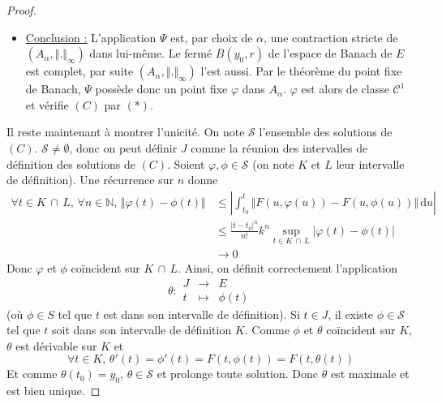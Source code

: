 \begin{proof}
\begin{itemize}
      où $k$ désigne le rapport de lipschitziannité de $F$. On choisit désormais $\alpha$ tel que $k \alpha < 1$ et $\alpha M < r$.
      \item \uline{Conclusion :} L'application $\Psi$ est, par choix de $\alpha$, une contraction stricte de $(A_\alpha, \Vert . \Vert_{\infty})$ dans lui-même. Le fermé $\overline{B}(y_0, r)$ de l'espace de Banach de $E$ est complet, par suite $(A_\alpha, \Vert . \Vert_{\infty})$ l'est aussi.
      \newpar
      Par le théorème du point fixe de Banach, $\Psi$ possède donc un point fixe $\varphi$ dans $A_\alpha$. $\varphi$ est alors de classe $\mathcal{C}^1$ et vérifie $(C)$ par $(*)$.
    \end{itemize}
    \medskip
    Il reste maintenant à montrer l'unicité. On note $\mathcal{S}$ l'ensemble des solutions de $(C)$. $\mathcal{S} \neq \emptyset$, donc on peut définir $J$ comme la réunion des intervalles de définition des solutions de $(C)$.
    \newpar
    Soient $\varphi, \phi \in \mathcal{S}$ (on note $K$ et $L$ leur intervalle de définition). Une récurrence sur $n$ donne
    \begin{align*}
      \forall t \in K \, \cap \, L, \, \forall n \in \mathbb{N}, \, \Vert \varphi(t) - \phi(t) \Vert &\leq \left| \int_{t_0}^t \Vert F(u, \varphi(u)) - F(u, \phi(u)) \Vert \, \mathrm{d}u \right| \\
      &\leq \frac{|t-t_0|^n}{n!} k^n \sup_{t \in K \, \cap \, L} |\varphi(t) - \phi(t)| \\
      &\longrightarrow 0
    \end{align*}
    Donc $\varphi$ et $\phi$ coïncident sur $K \, \cap \, L$.
    \newpar
    Ainsi, on définit correctement l'application
    \[
    \theta :
    \begin{array}{ccc}
      J &\rightarrow& E \\
      t &\mapsto& \phi(t)
    \end{array}
    \]
    (où $\phi \in S$ tel que $t$ est dans son intervalle de définition). Si $t \in J$, il existe $\phi \in \mathcal{S}$ tel que $t$ soit dans son intervalle de définition $K$. Comme $\phi$ et $\theta$ coïncident sur $K$, $\theta$ est dérivable sur $K$ et
    \[ \forall t \in K, \, \theta'(t) = \phi'(t) = F(t, \phi(t)) = F(t, \theta(t)) \]
    Et comme $\theta(t_0) = y_0$, $\theta \in \mathcal{S}$ et prolonge toute solution. Donc $\theta$ est maximale et est bien unique.
  \end{proof}

